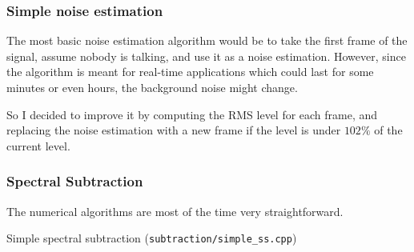 \subsubsection{Simple noise estimation}
The most basic noise estimation algorithm would be to take the first frame of the signal, assume nobody is talking, and use it as a noise estimation.
However, since the algorithm is meant for real-time applications which could last for some minutes or even hours, the background noise might change.

So I decided to improve it by computing the \ac{RMS} level for each frame, and replacing the noise estimation with a new frame if the level is under $102\%$ of the current level.
\newpage
\subsubsection{Spectral Subtraction}
The numerical algorithms are most of the time very straightforward.

\begin{algorithm}
 \SetAlgoLined

 \caption{Simple spectral subtraction (\texttt{subtraction/simple\_ss.cpp})}
\end{algorithm}

